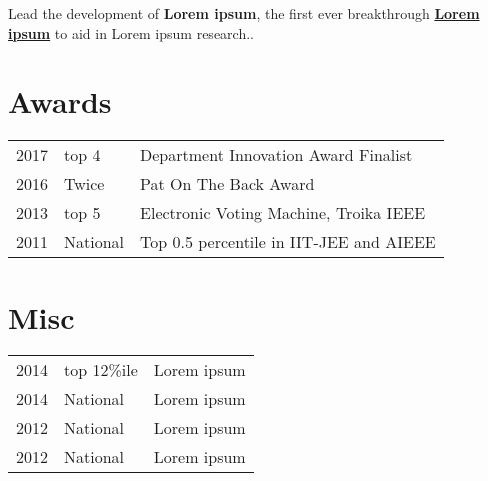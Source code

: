\documentclass[]{Resume_Piyush}
\begin{document}
\begin{minipage}[t]{0.66\textwidth}
Lead the development of \textbf{Lorem ipsum}, the first ever breakthrough \textbf{\href{http://conf.ling.cornell.edu/~tilsen/}{Lorem ipsum}} to aid in Lorem ipsum research..
\sectionsep


\section{Awards} 
\begin{tabular}{rll}
2017	     & top 4  & Department Innovation Award Finalist\\
2016	     & Twice & Pat On The Back Award\\
2013	     & top 5 & Electronic Voting Machine, Troika IEEE\\
2011     & National & Top 0.5 percentile in IIT-JEE and AIEEE \\
\end{tabular}
\sectionsep


\section{Misc} 

\begin{tabular}{rll}
2014 	& top 12\%ile    & Lorem ipsum\\
2014   & National   & Lorem ipsum\\
2012   &  National  & Lorem ipsum\\
2012   &  National   & Lorem ipsum\\
\end{tabular}
\sectionsep

\end{minipage} 
\end{document}
